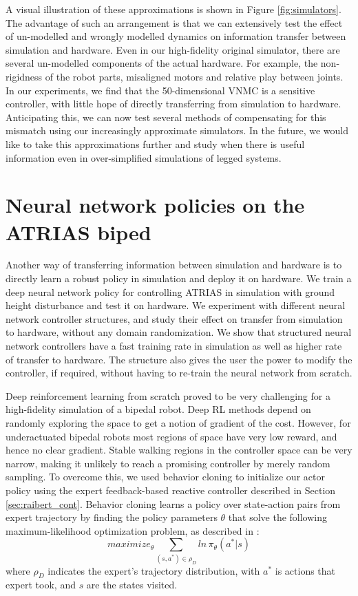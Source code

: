 A visual illustration of these approximations is shown in Figure \ref{fig:simulators}. The advantage of such an arrangement is that we can extensively test the effect of un-modelled and wrongly modelled dynamics on information transfer between simulation and hardware. Even in our high-fidelity original simulator, there are several un-modelled components of the actual hardware. For example, the non-rigidness of the robot parts, misaligned motors and relative play between joints. In our experiments, we find that the 50-dimensional VNMC is a sensitive controller, with little hope of directly transferring from simulation to hardware. Anticipating this, we can now test several methods of compensating for this mismatch using our increasingly approximate simulators. In the future, we would like to take this approximations further and study when there is useful information even in over-simplified simulations of legged systems.

\section{Neural network policies on the ATRIAS biped}

Another way of transferring information between simulation and hardware is to directly learn a robust policy in simulation and deploy it on hardware. We train a deep neural network policy for controlling ATRIAS in simulation with ground height disturbance and test it on hardware. We experiment with different neural network controller structures, and study their effect on transfer from simulation to hardware, without any domain randomization. We show that structured neural network controllers have a fast training rate in simulation as well as higher rate of transfer to hardware. The structure also gives the user the power to modify the controller, if required, without having to re-train the neural network from scratch.

Deep reinforcement learning from scratch proved to be very challenging for a high-fidelity simulation of a bipedal robot. Deep RL methods depend on randomly exploring the space to get a notion of gradient of the cost. However, for underactuated bipedal robots most regions of space have very low reward, and hence no clear gradient. Stable walking regions in the controller space can be very narrow, making it unlikely to reach a promising controller by merely random sampling. To overcome this, we used behavior cloning to initialize our actor policy using the expert feedback-based reactive controller described in Section \ref{sec:raibert_cont}. Behavior cloning learns a policy over state-action pairs from expert trajectory by finding the policy parameters $\theta$ that solve the following maximum-likelihood optimization problem, as described in  \cite{rajeswaran2017learning}: 
\begin{equation}
    maximize_\theta \sum_{(s,a^*) \in \rho_D} ln \, \pi_\theta (a^*|s)
\end{equation}
where $\rho_D$ indicates the expert's trajectory distribution, with  $a^*$ is actions that expert took, and $s$ are the states visited.

